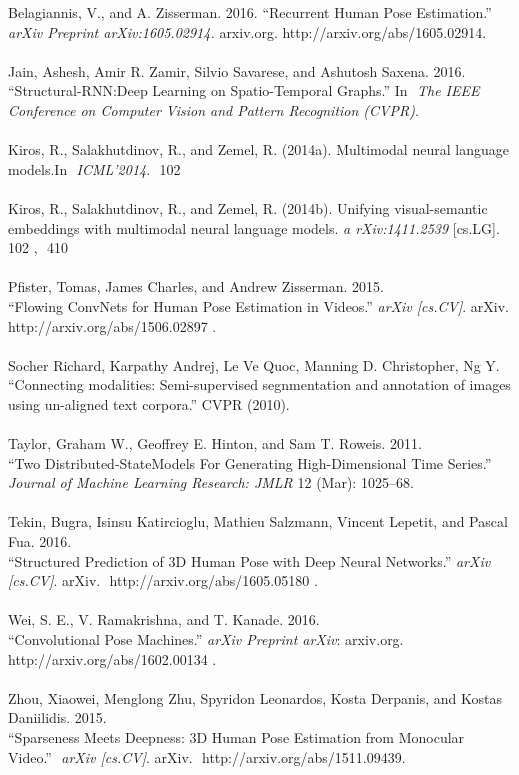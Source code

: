 \documentclass[a4paper, 12pt]{article}
\newcommand\tab[1][1cm]{\hspace*{#1}}
\begin{document}
Belagiannis, V., and A. Zisserman. 2016. “Recurrent Human Pose Estimation.” \\
\tab \textit{arXiv Preprint arXiv:1605.02914.} arxiv.org. ​
http://arxiv.org/abs/1605.02914. \\ \\ Jain, Ashesh, Amir R. Zamir, Silvio
Savarese, and Ashutosh Saxena. 2016. \\ \tab “Structural-RNN:Deep Learning on
Spatio-Temporal Graphs.” In ​ \textit{The IEEE Conference on Computer Vision and
Pattern Recognition (CVPR)}. \\ \\ Kiros, R., Salakhutdinov, R., and Zemel, R.
(2014a). Multimodal neural language models.In ​ \textit{ICML’2014}. ​ 102 \\ \\
Kiros, R., Salakhutdinov, R., and Zemel, R. (2014b). Unifying visual-semantic
embeddings with multimodal neural language models. \textit{a rXiv:1411.2539}
[cs.LG]. 102​ , ​ 410 \\ \\ Pfister, Tomas, James Charles, and Andrew Zisserman.
2015. \\ \tab “Flowing ConvNets for Human Pose Estimation in Videos.”
\textit{arXiv [cs.CV]}. arXiv. http://arxiv.org/abs/1506.02897​ . \\ \\ Socher
Richard, Karpathy Andrej, Le Ve Quoc, Manning D. Christopher, Ng Y. \\ \tab
“Connecting modalities: Semi-supervised segnmentation and annotation of images
using un-aligned text corpora.” CVPR (2010). \\ \\ Taylor, Graham W., Geoffrey
E. Hinton, and Sam T. Roweis. 2011. \\ \tab “Two Distributed-StateModels For
Generating High-Dimensional Time Series.” \textit{Journal of Machine Learning
Research: JMLR} 12 (Mar): 1025–68. \\ \\ Tekin, Bugra, Isinsu Katircioglu,
Mathieu Salzmann, Vincent Lepetit, and Pascal Fua. 2016. \\ \tab “Structured
Prediction of 3D Human Pose with Deep Neural Networks.” ​\textit{ arXiv
[cs.CV]}. arXiv. ​ http://arxiv.org/abs/1605.05180​ . \\ \\ Wei, S. E., V.
Ramakrishna, and T. Kanade. 2016. \\ \tab “Convolutional Pose Machines.”
\textit{ arXiv Preprint arXiv}: arxiv.org. http://arxiv.org/abs/1602.00134​ . \\ \\
Zhou, Xiaowei, Menglong Zhu, Spyridon Leonardos, Kosta Derpanis, and Kostas
Daniilidis. 2015. \\ \tab “Sparseness Meets Deepness: 3D Human Pose Estimation
from Monocular Video.” ​ \textit{arXiv [cs.CV]}. arXiv. ​
http://arxiv.org/abs/1511.09439​ .
\end{document}
